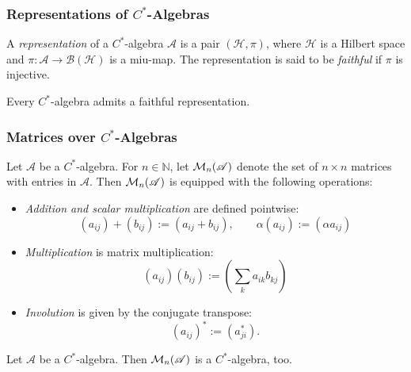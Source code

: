 \subsubsection{Representations of $C^*$-Algebras}

\begin{definition}
  A \emph{representation} of a \( C^* \)-algebra \(  \mathscr{A} \) is a pair \( (\mathcal{H}, \pi) \), where \( \mathcal{H} \) is a Hilbert space and \( \pi:  \mathscr{A} \to \mathcal{B}(\mathcal{H}) \) is a miu-map. The representation is said to be \emph{faithful} if \( \pi \) is injective. 
\end{definition}

\begin{theorem} \cite[Theorem 9.18.]{takesakiTheoryOperatorAlgebras1979}
  Every $C^*$-algebra admits a faithful representation.
\end{theorem}

\subsubsection{Matrices over $C^*$-Algebras}

\begin{definition}
  Let \( \mathscr{A} \) be a \(C^*\)-algebra. For \( n \in \mathbb{N} \), let \( \mathcal{M}_{n}(\mathscr{A} )\) denote the set of \( n \times n \) matrices with entries in \( \mathscr{A} \). Then \( \mathcal{M}_{n}(\mathscr{A} )\) is equipped with the following operations:

\begin{itemize}
    \item \emph{Addition and scalar multiplication} are defined pointwise:
    \[
    (a_{ij}) + (b_{ij}) := (a_{ij} + b_{ij}), \qquad
    \alpha (a_{ij}) := (\alpha a_{ij})
    \]
    
    \item \emph{Multiplication} is matrix multiplication:
    \[
    (a_{ij}) (b_{ij}) := \left( \sum_k a_{ik} b_{kj} \right)
    \]
    
    \item \emph{Involution} is given by the conjugate transpose:
    \[
    (a_{ij})^* := (a_{ji}^*).
    \]
\end{itemize}
\end{definition}

\begin{proposition} \cite[p.16-17]{paulsenCompletelyBoundedMaps2003}
  Let $ \mathscr{A}$ be a $C^*$-algebra. Then $\mathcal{M}_{n}(\mathscr{A})$ is a $C^*$-algebra, too.
\end{proposition}

